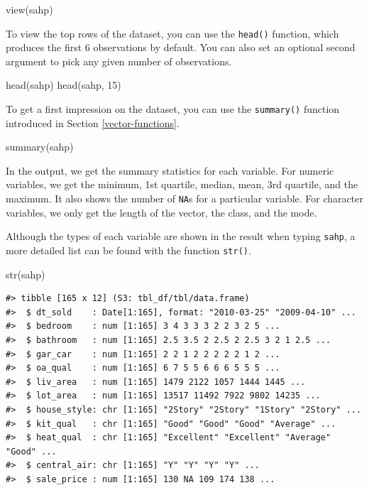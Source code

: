 \documentclass[
]{book}
\newenvironment{Shaded}{\begin{snugshade}}{\end{snugshade}}
\newcommand{\DecValTok}[1]{\textcolor[rgb]{0.00,0.00,0.81}{#1}}
\newcommand{\FunctionTok}[1]{\textcolor[rgb]{0.00,0.00,0.00}{#1}}
\newcommand{\NormalTok}[1]{#1}
\begin{document}
\begin{Shaded}
\begin{Highlighting}[]
\FunctionTok{view}\NormalTok{(sahp)}
\end{Highlighting}
\end{Shaded}

To view the top rows of the dataset, you can
use the \texttt{head()} function, which produces the first 6 observations by default. You can also set an optional second argument to pick any given number of observations.

\begin{Shaded}
\begin{Highlighting}[]
\FunctionTok{head}\NormalTok{(sahp)}
\FunctionTok{head}\NormalTok{(sahp, }\DecValTok{15}\NormalTok{)}
\end{Highlighting}
\end{Shaded}

To get a first impression on the dataset, you can use the \texttt{summary()} function introduced in Section \ref{vector-functions}.

\begin{Shaded}
\begin{Highlighting}[]
\FunctionTok{summary}\NormalTok{(sahp)}
\end{Highlighting}
\end{Shaded}

In the output, we get the summary statistics for each variable. For numeric variables, we get the minimum, 1st quartile, median, mean, 3rd quartile, and the maximum. It also shows the number of \texttt{NA}s for a particular variable. For character variables, we only get the length of the vector, the class, and the mode.

Although the types of each variable are shown in the result when typing \texttt{sahp}, a more detailed list can be found with the function \texttt{str()}.

\begin{Shaded}
\begin{Highlighting}[]
\FunctionTok{str}\NormalTok{(sahp)}
\end{Highlighting}
\end{Shaded}

\begin{verbatim}
#> tibble [165 x 12] (S3: tbl_df/tbl/data.frame)
#>  $ dt_sold    : Date[1:165], format: "2010-03-25" "2009-04-10" ...
#>  $ bedroom    : num [1:165] 3 4 3 3 3 2 2 3 2 5 ...
#>  $ bathroom   : num [1:165] 2.5 3.5 2 2.5 2 2.5 3 2 1 2.5 ...
#>  $ gar_car    : num [1:165] 2 2 1 2 2 2 2 2 1 2 ...
#>  $ oa_qual    : num [1:165] 6 7 5 5 6 6 6 5 5 5 ...
#>  $ liv_area   : num [1:165] 1479 2122 1057 1444 1445 ...
#>  $ lot_area   : num [1:165] 13517 11492 7922 9802 14235 ...
#>  $ house_style: chr [1:165] "2Story" "2Story" "1Story" "2Story" ...
#>  $ kit_qual   : chr [1:165] "Good" "Good" "Good" "Average" ...
#>  $ heat_qual  : chr [1:165] "Excellent" "Excellent" "Average" "Good" ...
#>  $ central_air: chr [1:165] "Y" "Y" "Y" "Y" ...
#>  $ sale_price : num [1:165] 130 NA 109 174 138 ...
\end{verbatim}
\end{document}
